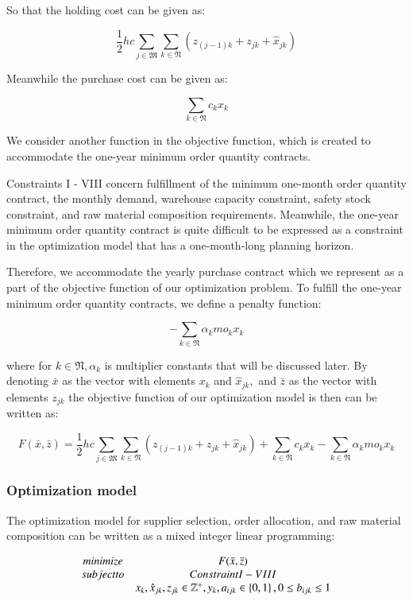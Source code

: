 \documentclass[preprint, 3p,
authoryear]{elsarticle} %
\begin{document}
So that the holding cost can be given as:

\[
\frac{1}{2} hc \sum_{j \in \mathfrak{M}} \sum_{k \in \mathfrak{N}} (z_{(j-1)k} + z_{jk} + \hat{x}_{jk})
\]

Meanwhile the purchase cost can be given as:

\[
  \sum_{k \in \mathfrak{N}} c_k x_k
\]

We consider another function in the objective function, which is created
to accommodate the one-year minimum order quantity contracts.

Constraints I - VIII concern fulfillment of the minimum one-month order
quantity contract, the monthly demand, warehouse capacity constraint,
safety stock constraint, and raw material composition requirements.
Meanwhile, the one-year minimum order quantity contract is quite
difficult to be expressed as a constraint in the optimization model that
has a one-month-long planning horizon.

Therefore, we accommodate the yearly purchase contract which we
represent as a part of the objective function of our optimization
problem. To fulfill the one-year minimum order quantity contracts, we
define a penalty function:

\[
  - \sum_{k \in \mathfrak{N}} \alpha_k mo_k x_k
\]

where for \(k \in \mathfrak{N}, \alpha_k\) is multiplier constants that
will be discussed later. By denoting \(\bar{x}\) as the vector with
elements \(x_k\) and \(\hat{x}_{jk},\) and \(\bar{z}\) as the vector
with elements \(z_{jk}\) the objective function of our optimization
model is then can be written as:

\[
  F(\bar{x},\bar{z}) = \frac{1}{2} hc \sum_{j \in \mathfrak{M}} \sum_{k \in \mathfrak{N}} (z_{(j-1)k} + z_{jk} + \hat{x}_{jk}) + \sum_{k \in \mathfrak{N}} c_k x_k - \sum_{k \in \mathfrak{N}} \alpha_k mo_k x_k
\]

\hypertarget{optimization-model}{%
\subsubsection{Optimization model}\label{optimization-model}}

The optimization model for supplier selection, order allocation, and raw
material composition can be written as a mixed integer linear
programming:

\[
\begin{matrix}
minimize & F(\bar{x},\bar{z}) \\
subject \space to & Constraint \space I-VIII \\
 & x_k, \hat{x}_{jk}, z_{jk} \in \mathbb{Z}^+, y_k, a_{ijk} \in \left\{0,1 \right\}, 0 \leq b_{ijk} \leq 1
\end{matrix}
\]
\end{document}
